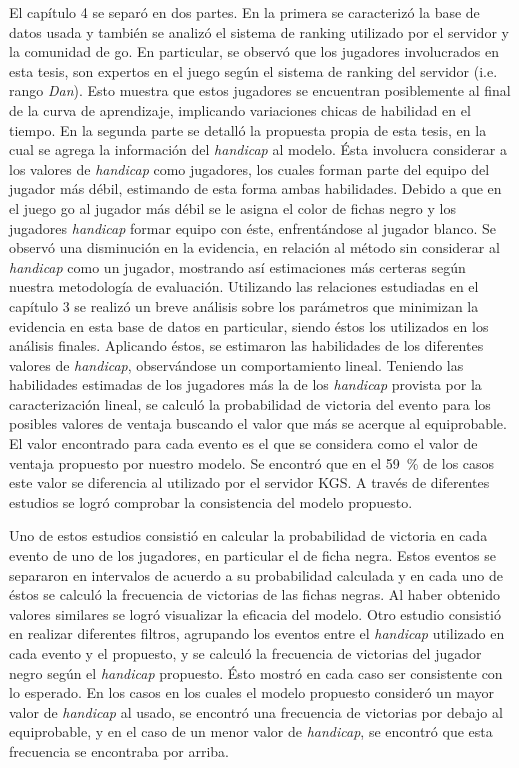 \documentclass[11pt,twoside,spanish]{report} %
\begin{document}
El cap\'itulo 4 se separ\'o en dos partes.
En la primera se caracteriz\'o la base de datos usada y tambi\'en se analiz\'o el sistema de ranking utilizado por el servidor y la comunidad de go.
En particular, se observ\'o que los jugadores involucrados en esta tesis, son expertos en el juego seg\'un el sistema de ranking del servidor (i.e. rango \textit{Dan}).
Esto muestra que estos jugadores se encuentran posiblemente al final de la curva de aprendizaje, implicando variaciones chicas de habilidad en el tiempo.
En la segunda parte se detall\'o la propuesta propia de esta tesis, en la cual se agrega la informaci\'on del \textit{handicap} al modelo.
\'Esta involucra considerar a los valores de \textit{handicap} como jugadores, los cuales forman parte del equipo del jugador m\'as d\'ebil, estimando de esta forma ambas habilidades.
Debido a que en el juego go al jugador m\'as d\'ebil se le asigna el color de fichas negro y los jugadores  \textit{handicap} formar equipo con \'este, enfrent\'andose al jugador blanco.
Se observ\'o una disminuci\'on en la evidencia, en relaci\'on al m\'etodo sin considerar al \textit{handicap} como un jugador, mostrando as\'i estimaciones m\'as certeras seg\'un nuestra metodolog\'ia de evaluaci\'on.
Utilizando las relaciones estudiadas en el cap\'itulo 3 se realiz\'o un breve an\'alisis sobre los par\'ametros que minimizan la evidencia en esta base de datos en particular, siendo \'estos los utilizados en los an\'alisis finales.
Aplicando \'estos, se estimaron las habilidades de los diferentes valores de \textit{handicap}, observ\'andose un comportamiento lineal.
Teniendo las habilidades estimadas de los jugadores m\'as la de los \textit{handicap} provista por la caracterizaci\'on lineal, se calcul\'o la probabilidad de victoria del evento para los posibles valores de ventaja buscando el valor que m\'as se acerque al equiprobable.
El valor encontrado para cada evento es el que se considera como el valor de ventaja propuesto por nuestro modelo.
Se encontr\'o que en el \SI{59}{\percent} de los casos este valor se diferencia al utilizado por el servidor KGS.
A trav\'es de diferentes estudios se logr\'o comprobar la consistencia del modelo propuesto.

Uno de estos estudios consisti\'o en calcular la probabilidad de victoria en cada evento de uno de los jugadores, en particular el de ficha negra.
Estos eventos se separaron en intervalos de acuerdo a su probabilidad calculada y en cada uno de \'estos se calcul\'o la frecuencia de victorias de las fichas negras.
Al haber obtenido valores similares se logr\'o visualizar la eficacia del modelo.
Otro estudio consisti\'o en realizar diferentes filtros, agrupando los eventos entre el \textit{handicap} utilizado en cada evento y el propuesto, y se calcul\'o la frecuencia de victorias del jugador negro seg\'un el \textit{handicap} propuesto.
\'Esto mostr\'o en cada caso ser consistente con lo esperado.
En los casos en los cuales el modelo propuesto consider\'o un mayor valor de \textit{handicap} al usado, se encontr\'o una frecuencia de victorias por debajo al equiprobable, y en el caso de un menor valor de \textit{handicap}, se encontr\'o que esta frecuencia se encontraba por arriba.
\end{document}
